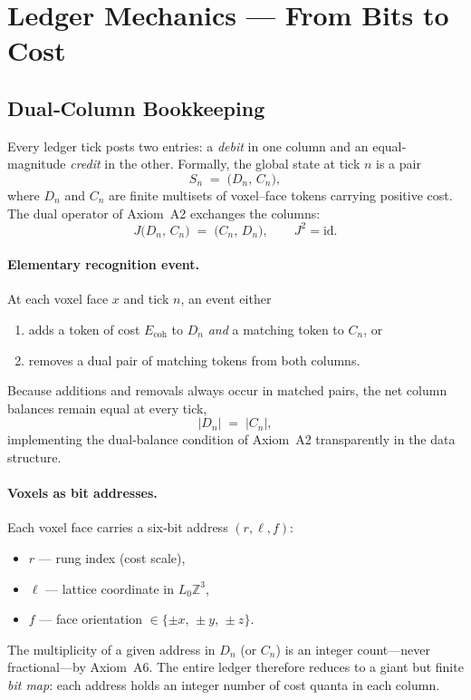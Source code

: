 \documentclass[11pt]{article}
\begin{document}
\section{Ledger Mechanics — From Bits to Cost}
\label{sec:ledger-mechanics}

\subsection{Dual‐Column Bookkeeping}
\label{subsec:dual-column}

Every ledger tick posts two entries: a \emph{debit} in one column and an equal‐magnitude \emph{credit} in the other.  Formally, the global state at tick \(n\) is a pair
\[
S_{n} \;=\; \bigl(D_{n},\,C_{n}\bigr),
\]
where \(D_{n}\) and \(C_{n}\) are finite multisets of voxel–face tokens carrying positive cost.  The dual operator of Axiom~A2 exchanges the columns:
\[
J\!\bigl(D_{n},\,C_{n}\bigr) \;=\; \bigl(C_{n},\,D_{n}\bigr),
\qquad
J^{2}=\mathrm{id}.
\]

\paragraph{Elementary recognition event.}
At each voxel face \(x\) and tick \(n\), an event either
\begin{enumerate}
  \item adds a token of cost \(E_{\text{coh}}\) to \(D_{n}\) \emph{and} a matching token to \(C_{n}\), or
  \item removes a dual pair of matching tokens from both columns.
\end{enumerate}
Because additions and removals always occur in matched pairs, the net column balances remain equal at every tick,
\[
|D_{n}| \;=\; |C_{n}|,
\]
implementing the dual‐balance condition of Axiom~A2 transparently in the data structure.

\paragraph{Voxels as bit addresses.}
Each voxel face carries a six‐bit address \((r,\ell,f)\):
\begin{itemize}
  \item \(r\) — rung index (cost scale),  
  \item \(\ell\) — lattice coordinate in \(L_{0}\mathbb{Z}^{3}\),  
  \item \(f\) — face orientation \(\in\{ \pm x,\,\pm y,\,\pm z\}\).
\end{itemize}
The multiplicity of a given address in \(D_{n}\) (or \(C_{n}\)) is an integer count—never fractional—by Axiom~A6.  The entire ledger therefore reduces to a giant but finite \emph{bit map}: each address holds an integer number of cost quanta in each column.
\end{document}
